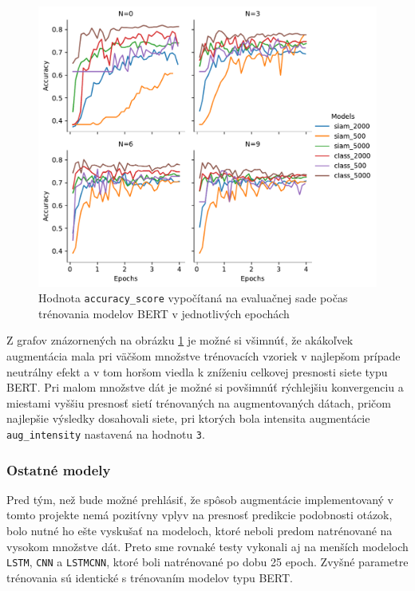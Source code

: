 \documentclass[a4paper, 16pt]{article}
\begin{document}
\begin{figure}[H]
    \centering
    \includegraphics[width=15cm]{BERT_graph.pdf}
    \caption{Hodnota \texttt{accuracy\_score} vypočítaná na evaluačnej sade počas trénovania modelov BERT v jednotlivých epochách}
    \label{fig:1}
\end{figure}

Z grafov znázornených na obrázku \ref{fig:1} je možné si všimnúť, že akákoľvek augmentácia mala pri väčšom množstve trénovacích vzoriek v najlepšom prípade neutrálny efekt a v tom horšom viedla k zníženiu celkovej presnosti siete typu BERT. Pri malom množstve dát je možné si povšimnúť rýchlejšiu konvergenciu a miestami vyššiu presnosť sietí trénovaných na augmentovaných dátach, pričom najlepšie výsledky dosahovali siete, pri ktorých bola intensita augmentácie \texttt{aug\_intensity} nastavená na hodnotu \texttt{3}.  

\subsubsection{Ostatné modely}
Pred tým, než bude možné prehlásiť, že spôsob augmentácie implementovaný v tomto projekte nemá pozitívny vplyv na presnosť predikcie podobnosti otázok, bolo nutné ho ešte vyskušať na modeloch, ktoré neboli predom natrénované na vysokom množstve dát. Preto sme rovnaké testy vykonali aj na menších modeloch \texttt{LSTM}, \texttt{CNN} a \texttt{LSTMCNN}, ktoré boli natrénované po dobu 25 epoch. Zvyšné parametre trénovania sú identické s trénovaním modelov typu BERT. 
\end{document}
